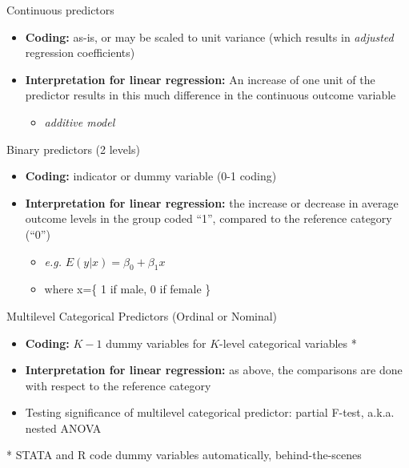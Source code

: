 \documentclass[
  ignorenonframetext,
]{beamer}
\providecommand{\tightlist}{%
  \setlength{\itemsep}{0pt}\setlength{\parskip}{0pt}}
\begin{document}
\begin{frame}{Continuous predictors}
\protect\hypertarget{continuous-predictors}{}

\begin{itemize}
\tightlist
\item
  \textbf{Coding:} as-is, or may be scaled to unit variance (which
  results in \emph{adjusted} regression coefficients)
\item
  \textbf{Interpretation for linear regression:} An increase of one unit
  of the predictor results in this much difference in the continuous
  outcome variable

  \begin{itemize}
  \tightlist
  \item
    \emph{additive model}
  \end{itemize}
\end{itemize}

\end{frame}

\begin{frame}{Binary predictors (2 levels)}
\protect\hypertarget{binary-predictors-2-levels}{}

\begin{itemize}
\tightlist
\item
  \textbf{Coding:} indicator or dummy variable (0-1 coding)
\item
  \textbf{Interpretation for linear regression:} the increase or
  decrease in average outcome levels in the group coded ``1'', compared
  to the reference category (``0'')

  \begin{itemize}
  \tightlist
  \item
    \emph{e.g.} \(E(y|x) = \beta_0 + \beta_1 x\)
  \item
    where x=\{ 1 if male, 0 if female \}
  \end{itemize}
\end{itemize}

\end{frame}

\begin{frame}{Multilevel Categorical Predictors (Ordinal or Nominal)}
\protect\hypertarget{multilevel-categorical-predictors-ordinal-or-nominal}{}

\begin{itemize}
\tightlist
\item
  \textbf{Coding:} \(K-1\) dummy variables for \(K\)-level categorical
  variables *
\item
  \textbf{Interpretation for linear regression:} as above, the
  comparisons are done with respect to the reference category
\item
  Testing significance of multilevel categorical predictor: partial
  F-test, a.k.a. nested ANOVA
\end{itemize}

\small

* STATA and R code dummy variables automatically, behind-the-scenes

\end{frame}
\end{document}

